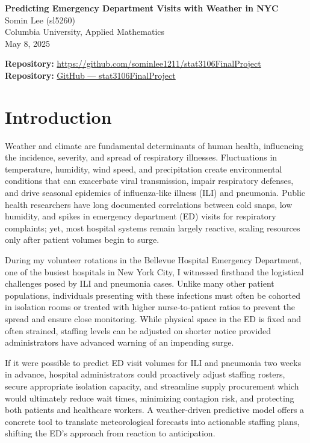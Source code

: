 \documentclass[11pt]{article}
\begin{document}
\begin{center}
  {\LARGE \textbf{Predicting Emergency Department Visits with Weather in NYC}}\\[1em]
  {\large Somin Lee (sl5260)}\\
  {\small Columbia University, Applied Mathematics}\\
  {\small May 8, 2025}
\end{center}

\vspace{1em}
\noindent\textbf{Repository:} \url{https://github.com/sominlee1211/stat3106FinalProject}\\
\noindent\textbf{Repository:} \href{https://github.com/sominlee1211/stat3106FinalProject}{GitHub — stat3106FinalProject}
\vspace{1em}

\section{Introduction}

Weather and climate are fundamental determinants of human health, influencing the incidence, severity, and spread of respiratory illnesses.  Fluctuations in temperature, humidity, wind speed, and precipitation create environmental conditions that can exacerbate viral transmission, impair respiratory defenses, and drive seasonal epidemics of influenza‐like illness (ILI) and pneumonia.  Public health researchers have long documented correlations between cold snaps, low humidity, and spikes in emergency department (ED) visits for respiratory complaints; yet, most hospital systems remain largely reactive, scaling resources only after patient volumes begin to surge.  

During my volunteer rotations in the Bellevue Hospital Emergency Department, one of the busiest hospitals in New York City, I witnessed firsthand the logistical challenges posed by ILI and pneumonia cases.  Unlike many other patient populations, individuals presenting with these infections must often be cohorted in isolation rooms or treated with higher nurse‐to‐patient ratios to prevent the spread and ensure close monitoring.  While physical space in the ED is fixed and often strained, staffing levels can be adjusted on shorter notice provided administrators have advanced warning of an impending surge.

If it were possible to predict ED visit volumes for ILI and pneumonia two weeks in advance, hospital administrators could proactively adjust staffing rosters, secure appropriate isolation capacity, and streamline supply procurement which would ultimately reduce wait times, minimizing contagion risk, and protecting both patients and healthcare workers.  A weather‐driven predictive model offers a concrete tool to translate meteorological forecasts into actionable staffing plans, shifting the ED’s approach from reaction to anticipation.  
\end{document}
